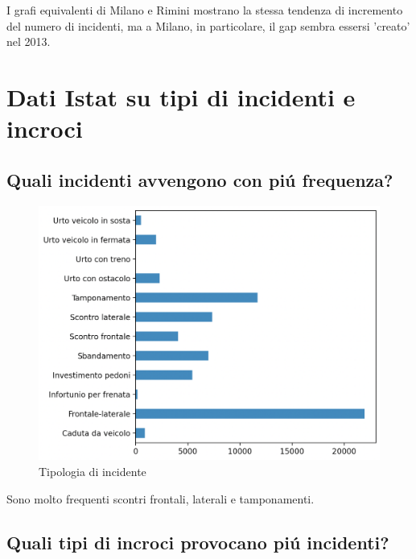 \documentclass[a4paper]{report}
\begin{document}
I grafi equivalenti di Milano e Rimini mostrano la stessa tendenza di incremento del numero 
di incidenti, ma a Milano, in particolare, il gap sembra essersi 'creato' nel 2013.


\newpage
\section{Dati Istat su tipi di incidenti e incroci}

\newpage
\subsection{Quali incidenti avvengono con pi\'u frequenza?}

\begin{figure}[!ht]
    \includegraphics[width=\linewidth]{../src/incidenti/incidenti_senza_coords/localizzazione_incidente/tipo_incidente.png}
    \caption{Tipologia di incidente}
    \label{fig:tipo_incidente}
\end{figure}

Sono molto frequenti scontri frontali, laterali e tamponamenti.

\newpage
\subsection{Quali tipi di incroci provocano pi\'u incidenti?}
\end{document}
